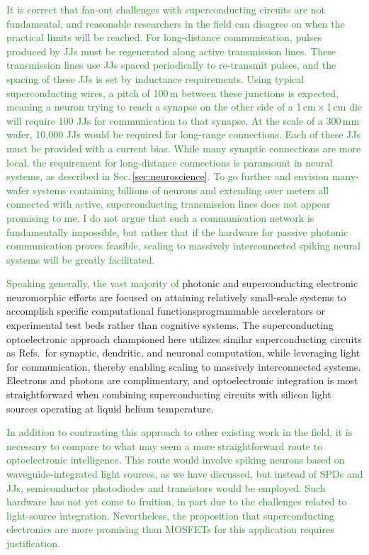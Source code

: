 \documentclass[twocolumn]{article}
\newcommand{\onlinecite}[1]{\hspace{-1 ex} \nocite{#1}\citenum{#1}}
\begin{document}
\textcolor{ForestGreen}{It is correct that fan-out challenges with superconducting circuits are not fundamental, and reasonable researchers in the field can disagree on when the practical limits will be reached. For long-distance communication, pulses produced by JJs must be regenerated along active transmission lines. These transmission lines use JJs spaced periodically to re-transmit pulses, and the spacing of these JJs is set by inductance requirements. Using typical superconducting wires, a pitch of 100\,\textmu m between these junctions is expected, meaning a neuron trying to reach a synapse on the other side of a 1\,cm\,$\times$\,1\,cm die will require 100 JJs for communication to that synapse. At the scale of a 300\,mm wafer, 10,000 JJs would be required for long-range connections. Each of these JJs must be provided with a current bias. While many synaptic connections are more local, the requirement for long-distance connections is paramount in neural systems, as described in Sec.\,\ref{sec:neuroscience}. To go further and envision many-wafer systems containing billions of neurons and extending over meters all connected with active, superconducting transmission lines does not appear promising to me. I do not argue that such a communication network is fundamentally impossible, but rather that if the hardware for passive photonic communication proves feasible, scaling to massively interconnected spiking neural systems will be greatly facilitated.}

\textcolor{ForestGreen}{Speaking generally, the vast majority of} photonic and superconducting electronic neuromorphic efforts are focused on attaining relatively small-scale systems to accomplish specific computational functions\textemdash programmable accelerators or experimental test beds rather than cognitive systems. The superconducting optoelectronic approach championed here utilizes similar superconducting circuits as Refs.\,\onlinecite{hias2007,sele2017,scdo2018} for synaptic, dendritic, and neuronal computation, while leveraging light for communication, thereby enabling scaling to massively interconnected systems. Electrons and photons are complimentary, and optoelectronic integration is most straightforward when combining superconducting circuits with silicon light sources operating at liquid helium temperature.

\textcolor{ForestGreen}{In addition to contrasting this approach to other existing work in the field, it is necessary to compare to what may seem a more straightforward route to optoelectronic intelligence. This route would involve spiking neurons based on waveguide-integrated light sources, as we have discussed, but instead of SPDs and JJs, semiconductor photodiodes and transistors would be employed. Such hardware has not yet come to fruition, in part due to the challenges related to light-source integration. Nevertheless, the proposition that superconducting electronics are more promising than MOSFETs for this application requires justification.}
\end{document}
